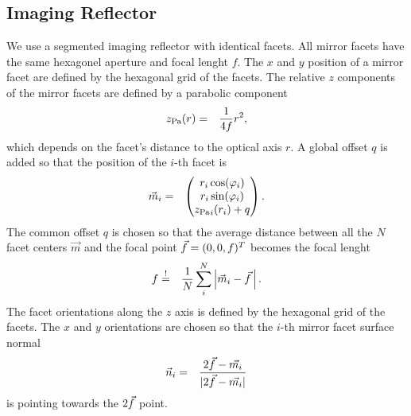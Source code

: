 \documentclass[11pt,a4paper,oneside,titlepage]{article}
\begin{document}
\subsection{Imaging Reflector}
%
We use a segmented imaging reflector with identical facets.
%
All mirror facets have the same hexagonel aperture and focal lenght $f$.
%
The $x$ and $y$ position of a mirror facet are defined by the hexagonal grid of the facets.
%
The relative $z$ components of the mirror facets are defined by a parabolic component
%
\begin{eqnarray}
    {z_\text{Pa}}(r) &=& \frac{1}{4 f} r^2,
\end{eqnarray}
%
which depends on the facet's distance to the optical axis $r$.
%
A global offset $q$ is added so that the position of the $i$-th facet is 
%
\begin{eqnarray}
\label{eq_mirror_position}
\vec{m}_{i} &=& \begin{pmatrix}   
                            r_i \cos(\varphi_{i})\\
                            r_i \sin(\varphi_{i})\\
                            {z_\text{Pa}}_{i}(r_i) + q 
                        \end{pmatrix}.
\end{eqnarray}
%
%
The common offset $q$ is chosen so that the average distance between all the $N$ facet centers $\vec{m}$ and the focal point $\vec{f} = (0,0, f)^T$ becomes the focal lenght
%
\begin{eqnarray}
    \label{eq_correct_focus}
    f &\stackrel{!}{=}& \frac{1}{N} \sum_{i}^N 
    \left \vert 
    \vec{m}_{i}- \vec{f}\,
    \right \vert.
\end{eqnarray}
%
The facet orientations along the $z$ axis is defined by the hexagonal grid of the facets.
%
The $x$ and $y$ orientations are chosen so that the $i$-th mirror facet surface normal
%
\begin{eqnarray}
\label{eq_facet_normal}
\vec{n}_{i} &=& \frac{2\vec{f} - \vec{m_i}}{\vert 2\vec{f} - \vec{m_i} \vert}
\end{eqnarray}
%
is pointing towards the $2 \vec{f}$ point.
%
%
\end{document}
